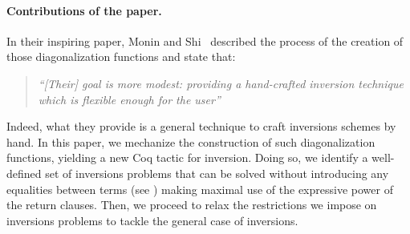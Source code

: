 \documentclass{llncs}
\begin{document}
\paragraph{Contributions of the paper.} 
In their inspiring paper, Monin and Shi~\cite{monin-shi} described the process of the creation of those diagonalization functions and state that: 
\begin{quote}
  \em ``[Their] goal is more modest: providing a hand-crafted inversion technique which is flexible enough for the user'' \end{quote} 
%
Indeed, what they provide is a general technique to craft inversions schemes by hand.  In this paper, we mechanize the construction of such diagonalization functions, yielding a new Coq tactic for inversion. 
%
Doing so, we identify a well-defined set of inversions problems that can be solved without introducing any equalities between terms (see \secref{}) making maximal use of the expressive power of the return clauses.
%
Then, we proceed to relax the restrictions we impose on inversions problems to tackle the general case of inversions. 
\end{document}
